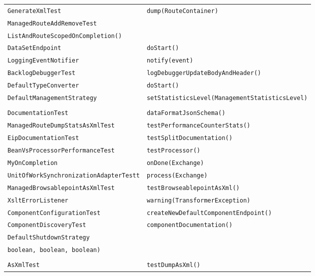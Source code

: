 \begin{center}
\begin{longtable}{ll}
\lstinline/GenerateXmlTest/&{\lstinline/dump(RouteContainer)/}\\
\lstinline/ManagedRouteAddRemoveTest/&\raisebox{-13pt}{\shortstack{\lstinline/testRouteAddRemoteRouteWithRecipient/-\\\lstinline/ListAndRouteScopedOnCompletion()/}}\\
\lstinline/DataSetEndpoint/&{\lstinline/doStart()/}\\
\lstinline/LoggingEventNotifier/&{\lstinline/notify(event)/}\\
\lstinline/BacklogDebuggerTest/&{\lstinline/logDebuggerUpdateBodyAndHeader()/}\\
\lstinline/DefaultTypeConverter/&{\lstinline/doStart()/}\\
\lstinline/DefaultManagementStrategy/&{\lstinline/setStatisticsLevel(ManagementStatisticsLevel)/}\\
\raisebox{-13pt}{\shortstack{\lstinline/StringDataFormatConfigurationAnd/-\\\lstinline/DocumentationTest/}}&{\lstinline/dataFormatJsonSchema()/}\\
\lstinline/ManagedRouteDumpStatsAsXmlTest/&{\lstinline/testPerformanceCounterStats()/}\\
\lstinline/EipDocumentationTest/&{\lstinline/testSplitDocumentation()/}\\
\lstinline/BeanVsProcessorPerformanceTest/&{\lstinline/testProcessor()/}\\
\lstinline/MyOnCompletion/&{\lstinline/onDone(Exchange)/}\\
\lstinline/UnitOfWorkSynchronizationAdapterTestt/&{\lstinline/process(Exchange)/}\\
\lstinline/ManagedBrowsablepointAsXmlTest/&{\lstinline/testBrowseablepointAsXml()/}\\
\lstinline/XsltErrorListener/&{\lstinline/warning(TransformerException)/}\\
\lstinline/ComponentConfigurationTest/&{\lstinline/createNewDefaultComponentEndpoint()/}\\
\lstinline/ComponentDiscoveryTest/&{\lstinline/componentDocumentation()/}\\
\lstinline/DefaultShutdownStrategy/&\raisebox{-13pt}{\shortstack{\lstinline/doShutdown(CamelContext, long, TimeUnit,/\\\lstinline/boolean, boolean, boolean)/}}\\
\raisebox{-13pt}{\shortstack{\lstinline/ManagedCamelContextDumpRoutes/-\\\lstinline/AsXmlTest/}}&{\lstinline/testDumpAsXml()/}\\

\end{longtable}
\end{center}
